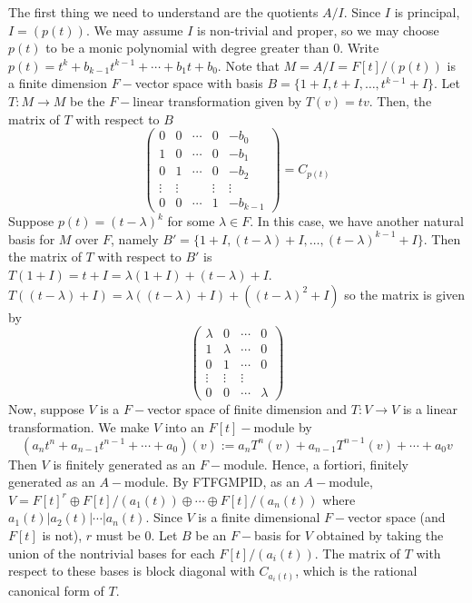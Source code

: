 \documentclass[11pt, a4paper]{memoir}
\theoremstyle{change}
\theoremstyle{plain}
\theoremstyle{nonumberplain}
\numberwithin{equation}{section}
\begin{document}
The first thing we need to understand are the quotients $A/I$.
Since $I$ is principal, $I=(p(t))$.
We may assume $I$ is non-trivial and proper, so we may choose $p(t)$ to be a monic polynomial with degree greater than 0.
Write $p(t)=t^k+b_{k-1}t^{k-1}+\cdots+b_1t+b_0$.
Note that $M=A/I=F[t]/(p(t))$ is a finite dimension $F-$vector space with basis $B=\{1+I,t+I,\ldots,t^{k-1}+I\}$.
Let $T:M\to M$ be the $F-$linear transformation given by $T(v)=tv$.
Then, the matrix of $T$ with respect to $B$
\begin{equation*}
    \begin{pmatrix}
        0&0&\cdots&0&-b_0\\
        1&0&\cdots&0&-b_1\\
        0&1&\cdots&0&-b_2\\
        \vdots&\vdots&&\vdots&\vdots\\
        0&0&\cdots&1&-b_{k-1}
    \end{pmatrix}
    =C_{p(t)}
\end{equation*}
Suppose $p(t)=(t-\lambda)^k$ for some $\lambda\in F$.
In this case, we have another natural basis for $M$ over $F$, namely $B'=\{1+I,(t-\lambda)+I,\ldots,(t-\lambda)^{k-1}+I\}$.
Then the matrix of $T$ with respect to $B'$ is $T(1+I)=t+I=\lambda(1+I)+(t-\lambda)+I$.
$T((t-\lambda)+I)=\lambda((t-\lambda)+I)+((t-\lambda)^2+I)$ so the matrix is given by
\begin{equation*}
    \begin{pmatrix}
        \lambda&0&\cdots&0\\
        1&\lambda&\cdots&0\\
        0&1&\cdots&0\\
        \vdots&\vdots&\vdots\\
        0&0&\cdots&\lambda
    \end{pmatrix}
\end{equation*}
Now, suppose $V$ is a $F-$vector space of finite dimension and $T:V\to V$ is a linear transformation.
We make $V$ into an $F[t]-$module by
\begin{equation*}
    (a_nt^n+a_{n-1}t^{n-1}+\cdots+a_0)(v):=a_nT^n(v)+a_{n-1}T^{n-1}(v)+\cdots+a_0v
\end{equation*}
Then $V$ is finitely generated as an $F-$module.
Hence, a fortiori, finitely generated as an $A-$module.
By FTFGMPID, as an $A-$module, $V=F[t]^r\oplus F[t]/(a_1(t))\oplus\cdots\oplus F[t]/(a_n(t))$ where $a_1(t)|a_2(t)|\cdots|a_n(t)$.
Since $V$ is a finite dimensional $F-$vector space (and $F[t]$ is not), $r$ must be 0.
Let $B$ be an $F-$basis for $V$ obtained by taking the union of the nontrivial bases for each $F[t]/(a_i(t))$.
The matrix of $T$ with respect to these bases is block diagonal with $C_{a_i(t)}$, which is the rational canonical form of $T$.
\end{document}
